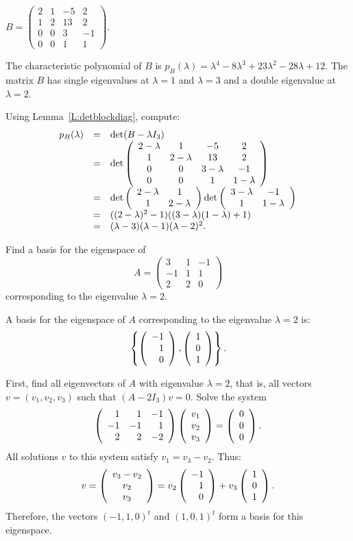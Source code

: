 \documentclass{ximera}
\begin{document}
\begin{exercise} \label{c10.2.1b}
$B = \left(\begin{array}{rrrr} 2 & 1 & -5 & 2 \\ 1 & 2 & 13 & 2 \\
0 & 0 & 3 & -1 \\ 0 & 0 & 1 & 1 \end{array}\right)$.

\begin{solution}

\ans The characteristic polynomial of $B$ is $p_B(\lambda) = \lambda^4
- 8\lambda^3 + 23\lambda^2 - 28\lambda + 12$.  The matrix $B$ has single
eigenvalues at $\lambda = 1$ and $\lambda = 3$ and a double eigenvalue at
$\lambda = 2$.

\soln Using Lemma~\ref{L:detblockdiag},
compute:
\[
\begin{array}{rcl}
p_B(\lambda) & = & \det(B - \lambda I_3) \\
& = & \det\left(\begin{array}{cccc}
2 - \lambda & 1 & -5 & 2 \\
1 & 2 - \lambda & 13 & 2 \\
0 & 0 & 3 - \lambda & -1 \\
0 & 0 & 1 & 1 - \lambda \end{array}\right) \\
& = & \det\left(\begin{array}{cc} 2 - \lambda & 1\\ 1 &2 - \lambda\end{array}\right)
\det\left(\begin{array}{cc} 3 - \lambda & -1\\ 1 &1 - \lambda\end{array}\right) \\
& = & ((2 - \lambda)^2 - 1)((3 - \lambda)(1 - \lambda) + 1) \\
& = & (\lambda - 3)(\lambda - 1)(\lambda - 2)^2.
\end{array}
\]

\end{solution}
\end{exercise}

\begin{exercise} \label{c10.2.2}
Find a basis for the eigenspace of 
\[
A = \left(\begin{array}{rrr} 3 & 1 & -1 \\ -1 & 1 & 1 \\ 2 & 2 & 0 
\end{array}\right)
\]
corresponding to the eigenvalue $\lambda=2$.

\begin{solution}

\ans A basis for the eigenspace of $A$ corresponding to the eigenvalue
$\lambda = 2$ is:
\[
\left\{\left(\begin{array}{r} -1 \\ 1 \\ 0\end{array}\right), \left(\begin{array}{r} 1 \\ 0 \\ 1\end{array}\right)\right\}.
\]

\soln First, find all eigenvectors of $A$ with eigenvalue
$\lambda = 2$, that is, all vectors $v = (v_1,v_2,v_3)$ such
that $(A - 2I_3)v = 0$.  Solve the system
\[
\left(\begin{array}{rrr} 1 & 1 & -1 \\ -1 & -1 & 1 \\ 2 & 2 & -2\end{array}\right)\left(\begin{array}{r} v_1 \\ v_2 \\ v_3\end{array}\right) =
\left(\begin{array}{r} 0 \\ 0 \\ 0\end{array}\right).
\]
All solutions $v$ to this system satisfy $v_1 = v_3 - v_2$.  Thus:
\[
v = \left(\begin{array}{c} v_3 - v_2 \\ v_2 \\ v_3\end{array}\right) = v_2\left(\begin{array}{r} -1 \\ 1 \\ 0\end{array}\right) +
v_3\left(\begin{array}{r} 1 \\ 0 \\ 1\end{array}\right).
\]
Therefore, the vectors $(-1,1,0)^t$ and $(1,0,1)^t$ form a basis
for this eigenspace.

\end{solution}
\end{exercise}
\end{document}
